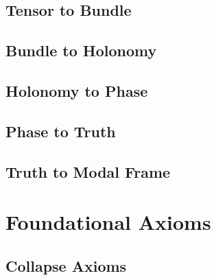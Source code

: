 \subsection{Tensor to Bundle}
\begin{definition}
\end{definition}

\subsection{Bundle to Holonomy}
\begin{definition}
\end{definition}

\subsection{Holonomy to Phase}
\begin{definition}
\end{definition}

\subsection{Phase to Truth}
\begin{definition}
\end{definition}

\subsection{Truth to Modal Frame}
\begin{definition}
\end{definition}



\section{Foundational Axioms}
\subsection{Collapse Axioms}
\begin{axiom}
\end{axiom}

